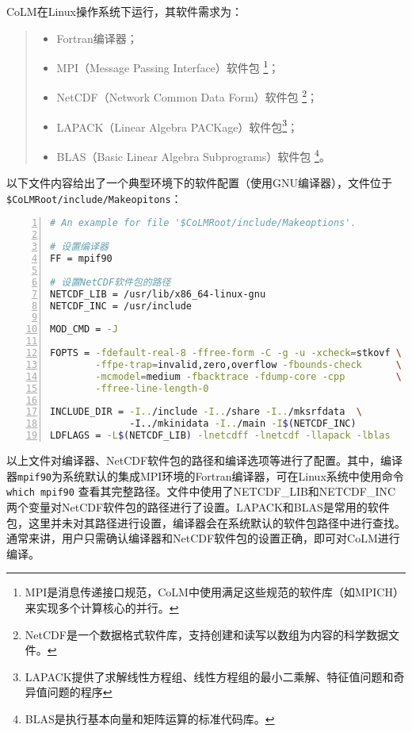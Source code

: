 \documentclass[a4paper,12pt,twoside]{article}
\begin{document}
CoLM在Linux操作系统下运行，其软件需求为：
\begin{quote}
\begin{itemize}
\setlength{\itemsep}{0pt}
\setlength{\parsep}{0pt}
\setlength{\parskip}{0pt}
    \item Fortran编译器；
    \item MPI（Message Passing Interface）软件包 \footnote{MPI是消息传递接口规范，CoLM中使用满足这些规范的软件库（如MPICH）来实现多个计算核心的并行。}；
    \item NetCDF（Network Common Data Form）软件包 \footnote{NetCDF是一个数据格式软件库，支持创建和读写以数组为内容的科学数据文件。}；
    \item LAPACK（Linear Algebra PACKage）软件包\footnote{LAPACK提供了求解线性方程组、线性方程组的最小二乘解、特征值问题和奇异值问题的程序}；
    \item BLAS（Basic Linear Algebra Subprograms）软件包 \footnote{BLAS是执行基本向量和矩阵运算的标准代码库。}。
\end{itemize}
\end{quote}

以下文件内容给出了一个典型环境下的软件配置（使用GNU编译器），文件位于\texttt{\$CoLMRoot/include/\allowbreak Makeopitons}：
\begin{lstlisting}[language=bash, basicstyle=\linespread{1.2}\footnotesize\ttfamily, commentstyle=\color{olive}, numbers=left, numberstyle=\tiny, xleftmargin=1.5em,xrightmargin=0em, aboveskip=1em]
# An example for file '$CoLMRoot/include/Makeoptions'.

# 设置编译器
FF = mpif90

# 设置NetCDF软件包的路径
NETCDF_LIB = /usr/lib/x86_64-linux-gnu
NETCDF_INC = /usr/include

MOD_CMD = -J

FOPTS = -fdefault-real-8 -ffree-form -C -g -u -xcheck=stkovf \
        -ffpe-trap=invalid,zero,overflow -fbounds-check      \
        -mcmodel=medium -fbacktrace -fdump-core -cpp         \
        -ffree-line-length-0

INCLUDE_DIR = -I../include -I../share -I../mksrfdata  \ 
              -I../mkinidata -I../main -I$(NETCDF_INC)
LDFLAGS = -L$(NETCDF_LIB) -lnetcdff -lnetcdf -llapack -lblas

\end{lstlisting}

以上文件对编译器、NetCDF软件包的路径和编译选项等进行了配置。其中，编译器\texttt{mpif90}为系统默认的集成MPI环境的Fortran编译器，可在Linux系统中使用命令 \texttt{which mpif90} 查看其完整路径。文件中使用了NETCDF\_LIB和NETCDF\_INC两个变量对NetCDF软件包的路径进行了设置。LAPACK和BLAS是常用的软件包，这里并未对其路径进行设置，编译器会在系统默认的软件包路径中进行查找。通常来讲，用户只需确认编译器和NetCDF软件包的设置正确，即可对CoLM进行编译。
\end{document}

